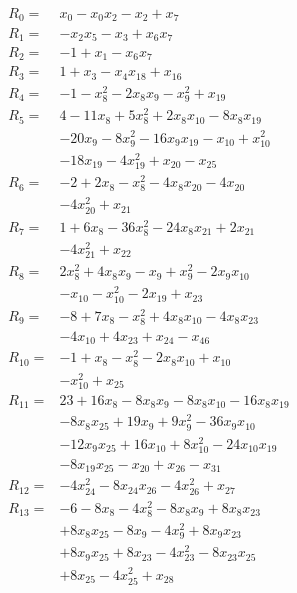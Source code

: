 \allowdisplaybreaks[4]
\begin{align*}
R_{0}={}&x_{0} -x_{0}x_{2} -x_{2} +x_{7}\\[3pt]
R_{1}={}&-x_{2}x_{5} -x_{3} +x_{6}x_{7}\\[3pt]
R_{2}={}&-1 +x_{1} -x_{6}x_{7}\\[3pt]
R_{3}={}&1 +x_{3} -x_{4}x_{18} +x_{16}\\[3pt]
R_{4}={}&-1 -x_{8}^{2} -2x_{8}x_{9} -x_{9}^{2} +x_{19}\\[3pt]
R_{5}={}&4 -11x_{8} +5x_{8}^{2} +2x_{8}x_{10} -8x_{8}x_{19}\\
&-20x_{9} -8x_{9}^{2} -16x_{9}x_{19} -x_{10} +x_{10}^{2}\\
&-18x_{19} -4x_{19}^{2} +x_{20} -x_{25}\\[3pt]
R_{6}={}&-2 +2x_{8} -x_{8}^{2} -4x_{8}x_{20} -4x_{20}\\
&-4x_{20}^{2} +x_{21}\\[3pt]
R_{7}={}&1 +6x_{8} -36x_{8}^{2} -24x_{8}x_{21} +2x_{21}\\
&-4x_{21}^{2} +x_{22}\\[3pt]
R_{8}={}&2x_{8}^{2} +4x_{8}x_{9} -x_{9} +x_{9}^{2} -2x_{9}x_{10}\\
&-x_{10} -x_{10}^{2} -2x_{19} +x_{23}\\[3pt]
R_{9}={}&-8 +7x_{8} -x_{8}^{2} +4x_{8}x_{10} -4x_{8}x_{23}\\
&-4x_{10} +4x_{23} +x_{24} -x_{46}\\[3pt]
R_{10}={}&-1 +x_{8} -x_{8}^{2} -2x_{8}x_{10} +x_{10}\\
&-x_{10}^{2} +x_{25}\\[3pt]
R_{11}={}&23 +16x_{8} -8x_{8}x_{9} -8x_{8}x_{10} -16x_{8}x_{19}\\
&-8x_{8}x_{25} +19x_{9} +9x_{9}^{2} -36x_{9}x_{10}\\
&-12x_{9}x_{25} +16x_{10} +8x_{10}^{2} -24x_{10}x_{19}\\
&-8x_{19}x_{25} -x_{20} +x_{26} -x_{31}\\[3pt]
R_{12}={}&-4x_{24}^{2} -8x_{24}x_{26} -4x_{26}^{2} +x_{27}\\[3pt]
R_{13}={}&-6 -8x_{8} -4x_{8}^{2} -8x_{8}x_{9} +8x_{8}x_{23}\\
&+8x_{8}x_{25} -8x_{9} -4x_{9}^{2} +8x_{9}x_{23}\\
&+8x_{9}x_{25} +8x_{23} -4x_{23}^{2} -8x_{23}x_{25}\\
&+8x_{25} -4x_{25}^{2} +x_{28}\\[3pt]

\end{align*}
